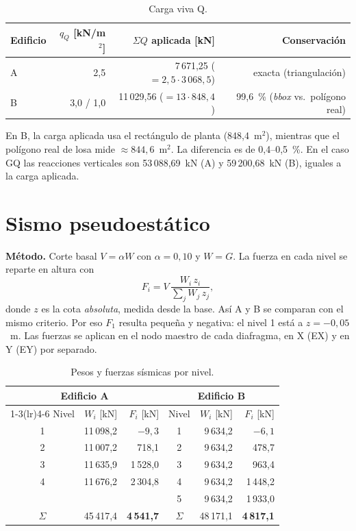 \documentclass[11pt,a4paper]{article}
\begin{document}
\begin{table}[h]
\centering
\caption{Carga viva Q.}
\begin{tabular}{lrrr}
\toprule
Edificio & $q_Q$ [kN/m$^2$] & $\Sigma Q$ aplicada [kN] & Conservación \\
\midrule
A & 2,5 & 7\,671,25 ($= 2{,}5\cdot3\,068{,}5$) & exacta (triangulación) \\
B & 3,0 / 1,0 & 11\,029,56 ($= 13\cdot848{,}4$) & 99,6~\% (\emph{bbox} vs.\ polígono real) \\
\bottomrule
\end{tabular}
\end{table}

En B, la carga aplicada usa el rectángulo de planta (848,4~m$^2$), mientras que
el polígono real de losa mide $\approx 844{,}6$~m$^2$. La diferencia es de
0,4--0,5~\%. En el caso GQ las reacciones verticales son 53\,088,69~kN (A) y
59\,200,68~kN (B), iguales a la carga aplicada.

\section{Sismo pseudoestático}

\textbf{Método.} Corte basal $V = \alpha W$ con $\alpha = 0{,}10$ y $W = G$.
La fuerza en cada nivel se reparte en altura con
\[
F_i = V\,\frac{W_i\,z_i}{\sum_j W_j\,z_j},
\]
donde $z$ es la cota \emph{absoluta}, medida desde la base. Así A y B se
comparan con el mismo criterio. Por eso $F_1$ resulta pequeña y negativa: el
nivel 1 está a $z = -0{,}05$~m. Las fuerzas se aplican en el nodo maestro de
cada diafragma, en X (EX) y en Y (EY) por separado.

\begin{table}[h]
\centering
\caption{Pesos y fuerzas sísmicas por nivel.}
\begin{tabular}{crrcrr}
\toprule
\multicolumn{3}{c}{Edificio A} & \multicolumn{3}{c}{Edificio B} \\
\cmidrule(lr){1-3}\cmidrule(lr){4-6}
Nivel & $W_i$ [kN] & $F_i$ [kN] & Nivel & $W_i$ [kN] & $F_i$ [kN] \\
\midrule
1 & 11\,098,2 & $-9{,}3$ & 1 & 9\,634,2 & $-6{,}1$ \\
2 & 11\,007,2 & 718,1 & 2 & 9\,634,2 & 478,7 \\
3 & 11\,635,9 & 1\,528,0 & 3 & 9\,634,2 & 963,4 \\
4 & 11\,676,2 & 2\,304,8 & 4 & 9\,634,2 & 1\,448,2 \\
  &           &          & 5 & 9\,634,2 & 1\,933,0 \\
\midrule
$\Sigma$ & 45\,417,4 & \textbf{4\,541,7} & $\Sigma$ & 48\,171,1 & \textbf{4\,817,1} \\
\bottomrule
\end{tabular}
\end{table}
\end{document}
